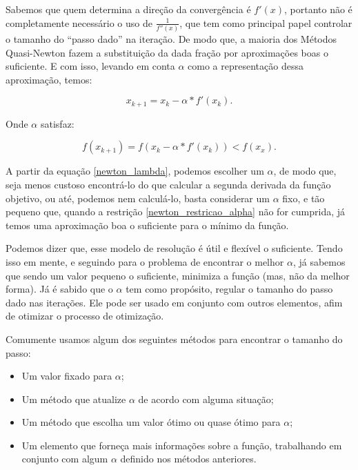 Sabemos que quem determina a direção da convergência é \(f'(x)\), portanto
não é completamente necessário o uso de \( \frac{1}{f''(x)} \), que
tem como principal papel controlar o tamanho do ``passo dado'' na iteração.
De modo que, a maioria dos Métodos Quasi-Newton fazem a substituição
da dada fração por aproximações boas o suficiente. E com isso, levando em
conta $\alpha$ como a representação dessa aproximação, temos:

\begin{equation}
    x_{k+1} = x_{k} -  \alpha * f'(x_{k}).
    \label{newton_lambda}
\end{equation}

Onde \(\alpha\) satisfaz:

\begin{equation}
    f(x_{k+1}) = f(x_{k} -  \alpha * f'(x_{k})) < f(x_{x}).
    \label{newton_restricao_alpha}
\end{equation}

A partir da equação \ref{newton_lambda}, podemos escolher um \(\alpha\), de
modo que, seja menos custoso encontrá-lo do que calcular a segunda derivada
da função objetivo, ou até, podemos nem calculá-lo, basta considerar
um \(\alpha\) fixo, e tão pequeno que, quando a restrição
\ref{newton_restricao_alpha} não for cumprida, já temos uma aproximação boa o
suficiente para o mínimo da função.

Podemos dizer que, esse modelo de resolução é útil e flexível o
suficiente. Tendo isso em mente, e seguindo para o problema de encontrar
o melhor \(\alpha\), já sabemos que sendo um valor pequeno o
suficiente, minimiza a função (mas, não da melhor forma). Já é sabido
que o \(\alpha\) tem como propósito, regular o tamanho do passo dado nas
iterações. Ele pode ser usado em conjunto com outros elementos, afim de
otimizar o processo de otimização.

Comumente usamos algum dos seguintes métodos para encontrar o tamanho do
passo:

    \begin{itemize}
            \item Um valor fixado para \(\alpha\);
            \item Um método que atualize \(\alpha\) de acordo com alguma
                situação;
            \item Um método que escolha um valor ótimo ou quase ótimo para
                \(\alpha\);
            \item Um elemento que forneça mais informações sobre a função,
                trabalhando em conjunto com algum \(\alpha\) definido nos
                métodos anteriores.
    \end{itemize}


